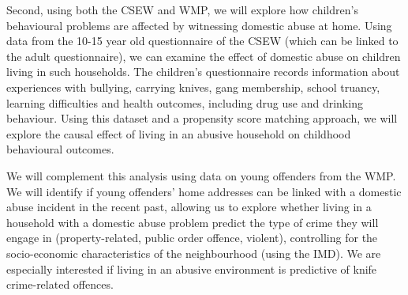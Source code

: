 \documentclass[11pt, a4paper]{article}
\begin{document}
Second, using both the CSEW and WMP, we will explore how children's behavioural problems are affected by witnessing domestic abuse at home. Using data from the 10-15 year old questionnaire of the CSEW (which can be linked to the adult questionnaire), we can examine the effect of domestic abuse on children living in such households. The children's questionnaire records information about experiences with bullying, carrying knives, gang membership, school truancy, learning difficulties and health outcomes, including drug use and drinking behaviour. Using this dataset and a propensity score matching approach, we will explore the causal effect of living in an abusive household on childhood behavioural outcomes.

We will complement this analysis using data on young offenders from the WMP. We will identify if young offenders' home addresses can be linked with a domestic abuse incident in the recent past, allowing us to explore whether living in a household with a domestic abuse problem predict the type of crime they will engage in (property-related, public order offence, violent), controlling for the socio-economic characteristics of the neighbourhood (using the IMD). We are especially interested if living in an abusive environment is predictive of knife crime-related offences.
\end{document}

